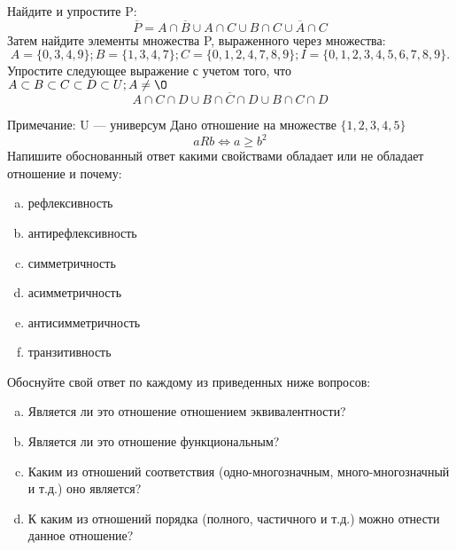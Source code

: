 \documentclass[10pt]{exam}
\begin{document}
\begin{questions}
\question
Найдите и упростите P:
\begin{equation*}
\overline{P} = A \cap \overline{B} \cup A \cap C \cup B \cap C \cup \overline{A} \cap C
\end{equation*}
Затем найдите элементы множества P, выраженного через множества:
\begin{equation*}
A = \{0, 3, 4, 9\}; 
B = \{1, 3, 4, 7\};
C = \{0, 1, 2, 4, 7, 8, 9\};
I = \{0, 1, 2, 3, 4, 5, 6, 7, 8, 9\}.
\end{equation*}\question
Упростите следующее выражение с учетом того, что $A\subset B \subset C \subset D \subset U; A \neq \O$
\begin{equation*}
A \cap C  \cap D \cup B \cap \overline{C} \cap D \cup B \cap C \cap D
\end{equation*}

Примечание: U — универсум\question
Дано отношение на множестве $\{1, 2, 3, 4, 5\}$ 
\begin{equation*}
aRb \iff a \geq b^2
\end{equation*}
Напишите обоснованный ответ какими свойствами обладает или не обладает отношение и почему:   
\begin{enumerate} [a)]\setcounter{enumi}{0}
\item рефлексивность
\item антирефлексивность
\item симметричность
\item асимметричность
\item антисимметричность
\item транзитивность
\end{enumerate}

Обоснуйте свой ответ по каждому из приведенных ниже вопросов:
\begin{enumerate} [a)]\setcounter{enumi}{0}
    \item Является ли это отношение отношением эквивалентности?
    \item Является ли это отношение функциональным?
    \item Каким из отношений соответствия (одно-многозначным, много-многозначный и т.д.) оно является?
    \item К каким из отношений порядка (полного, частичного и т.д.) можно отнести данное отношение?
\end{enumerate}



\end{questions}
\end{document}

